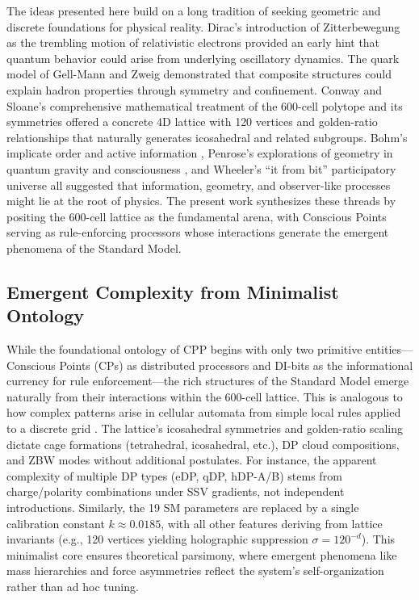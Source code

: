 \documentclass{article}
\begin{document}
The ideas presented here build on a long tradition of seeking geometric and discrete foundations for physical reality. Dirac’s introduction of Zitterbewegung as the trembling motion of relativistic electrons \cite{dirac1928} provided an early hint that quantum behavior could arise from underlying oscillatory dynamics. The quark model of Gell-Mann and Zweig \cite{gellmann1964,zweig1964} demonstrated that composite structures could explain hadron properties through symmetry and confinement. Conway and Sloane’s comprehensive mathematical treatment of the 600-cell polytope and its symmetries \cite{conway2008} offered a concrete 4D lattice with 120 vertices and golden-ratio relationships that naturally generates icosahedral and related subgroups. Bohm’s implicate order and active information \cite{bohm1980}, Penrose’s explorations of geometry in quantum gravity and consciousness \cite{penrose1989}, and Wheeler’s “it from bit” participatory universe \cite{wheeler1990} all suggested that information, geometry, and observer-like processes might lie at the root of physics. The present work synthesizes these threads by positing the 600-cell lattice as the fundamental arena, with Conscious Points serving as rule-enforcing processors whose interactions generate the emergent phenomena of the Standard Model.

\subsection{Emergent Complexity from Minimalist Ontology}

While the foundational ontology of CPP begins with only two primitive entities---Conscious Points (CPs) as distributed processors and DI-bits as the informational currency for rule enforcement---the rich structures of the Standard Model emerge naturally from their interactions within the 600-cell lattice. This is analogous to how complex patterns arise in cellular automata from simple local rules applied to a discrete grid \cite{conway1970game}. The lattice's icosahedral symmetries and golden-ratio scaling dictate cage formations (tetrahedral, icosahedral, etc.), DP cloud compositions, and ZBW modes without additional postulates. For instance, the apparent complexity of multiple DP types (eDP, qDP, hDP-A/B) stems from charge/polarity combinations under SSV gradients, not independent introductions. Similarly, the 19 SM parameters are replaced by a single calibration constant $k \approx 0.0185$, with all other features deriving from lattice invariants (e.g., 120 vertices yielding holographic suppression $\sigma = 120^{-d}$). This minimalist core ensures theoretical parsimony, where emergent phenomena like mass hierarchies and force asymmetries reflect the system's self-organization rather than ad hoc tuning.
\end{document}
